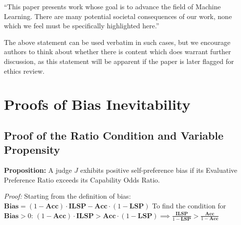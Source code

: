 \documentclass{article}
\theoremstyle{plain}
\theoremstyle{definition}
\theoremstyle{remark}
\begin{document}
``This paper presents work whose goal is to advance the field of Machine
Learning. There are many potential societal consequences of our work, none
which we feel must be specifically highlighted here.''

The above statement can be used verbatim in such cases, but we encourage
authors to think about whether there is content which does warrant further
discussion, as this statement will be apparent if the paper is later flagged
for ethics review.




\newpage
\appendix
\onecolumn
\appendix
\section{Proofs of Bias Inevitability}

\subsection{Proof of the Ratio Condition and Variable Propensity}
\label{proof:ratio}
\textbf{Proposition:} A judge $J$ exhibits positive self-preference bias if its Evaluative Preference Ratio exceeds its Capability Odds Ratio.

\textit{Proof:} Starting from the definition of bias:
$ \textbf{Bias} = (1 - \textbf{Acc}) \cdot \textbf{ILSP} - \textbf{Acc} \cdot (1 - \textbf{LSP}) $
To find the condition for $\textbf{Bias} > 0$:
$ (1 - \textbf{Acc}) \cdot \textbf{ILSP} > \textbf{Acc} \cdot (1 - \textbf{LSP}) \implies \frac{\textbf{ILSP}}{1 - \textbf{LSP}} > \frac{\textbf{Acc}}{1 - \textbf{Acc}} $
\end{document}
